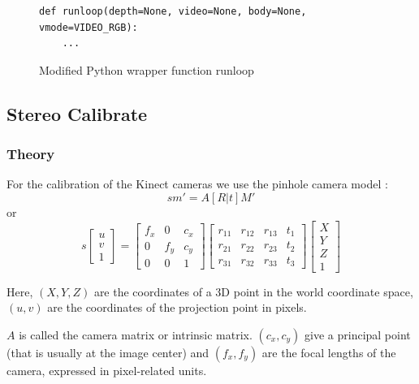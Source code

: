 \begin{figure}[H]
\begin{lstlisting}
def runloop(depth=None, video=None, body=None, vmode=VIDEO_RGB):
    ...
\end{lstlisting}
\caption{Modified Python wrapper function runloop}
\label{code:mod_runloop}
\end{figure}


\subsection{Stereo Calibrate}
\label{sec:stereo_calibrate}

\subsubsection{Theory}
For the calibration of the Kinect cameras we use the pinhole camera model \cite{OPENCV}:
\[
s m' = A \left[R|t\right]M'
\]
or
\[
s 
\left[ \begin{array}{c} 
u\\
v\\
1  
\end{array} \right]
=
\left[ \begin{array}{ccc} 
f_x & 0 & c_x\\
0 & f_y & c_y\\
0 & 0 & 1  
\end{array} \right]
\left[ \begin{array}{cccc}
r_{11} & r_{12} & r_{13} & t_1\\
r_{21} & r_{22} & r_{23} & t_2\\
r_{31} & r_{32} & r_{33} & t_3
\end{array} \right]
\left[ \begin{array}{c} 
X\\
Y\\
Z\\
1  
\end{array} \right]
\]

Here, $\left( X, Y, Z \right)$ are the coordinates of a 3D point in the world coordinate space, $\left( u, v \right)$ are the coordinates of the projection point in pixels.

$A$ is called the camera matrix or intrinsic matrix. $\left( c_x, c_y \right)$ give a principal point (that is usually at the image center) and $\left( f_x, f_y \right)$ are the focal lengths of the camera, expressed in pixel-related units.

